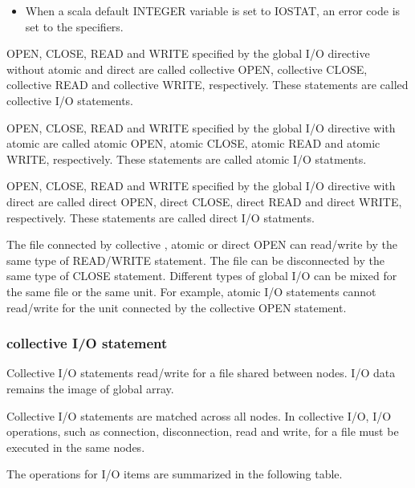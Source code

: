 \begin{itemize}
    \item When a scala default INTEGER variable is set to IOSTAT, an
	  error code is set to the specifiers.
	 
   \end{itemize}

   OPEN, CLOSE, READ and WRITE specified by the global I/O directive
   without atomic and direct are called collective OPEN, collective
   CLOSE, collective READ and collective WRITE, respectively.
   These statements are called collective I/O statements.

   OPEN, CLOSE, READ and WRITE specified by the global I/O directive
   with atomic are called atomic OPEN, atomic CLOSE, atomic READ and
   atomic WRITE, respectively.
   These statements are called atomic I/O statments.

   OPEN, CLOSE, READ and WRITE specified by the global I/O directive
   with direct are called direct OPEN, direct CLOSE, direct READ and
   direct WRITE, respectively.
   These statements are called direct I/O statments.

   The file connected by collective , atomic or direct OPEN can
   read/write by the same type of READ/WRITE statement.
   The file can be disconnected by the same type of CLOSE statement.
   Different types of global I/O can be mixed for the same file or the
   same unit.
   For example, atomic I/O statements cannot read/write for the unit
   connected by the collective OPEN statement.

   \clearpage
   
   \subsubsection{collective I/O statement}

   Collective I/O statements read/write for a file shared between nodes.
   I/O data remains the image of global array.

   Collective I/O statements are matched across all nodes.
   In collective I/O, I/O operations, such as connection, disconnection,
   read and write, for a file must be executed in the same nodes. 
   
   The operations for I/O items are summarized in the following table.

